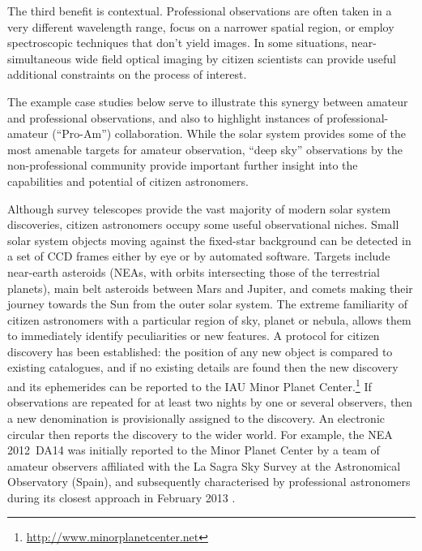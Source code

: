 \documentclass{ar2e}
\begin{document}
The third benefit is contextual.  Professional observations are often taken in a
very different wavelength range, focus on a narrower spatial region, or employ
spectroscopic techniques that don't yield images. In some situations,
near-simultaneous wide field optical imaging by citizen scientists can provide
useful additional constraints on the process of interest.

The example case studies below serve to illustrate this synergy between amateur
and professional observations, and also to highlight instances of
professional-amateur (``Pro-Am'') collaboration. While the solar system provides
some of the most amenable targets for amateur observation, ``deep sky''
observations by the non-professional community provide important further insight
into the capabilities and potential of citizen astronomers.



Although survey telescopes provide the vast majority of modern solar system
discoveries, citizen astronomers occupy some useful observational niches.  Small
solar system objects moving against the fixed-star background can be detected in
a set of CCD frames either by eye or by automated software. Targets include
near-earth asteroids (NEAs, with orbits intersecting those of the terrestrial
planets), main belt asteroids between Mars and Jupiter, and comets making their
journey towards the Sun from the outer solar system. The extreme familiarity of
citizen astronomers with a particular region of sky, planet or nebula, allows
them to immediately identify peculiarities or new features.  A protocol for
citizen discovery has been established: the position of any new object is
compared to existing catalogues, and if no existing details are found then the
new discovery and its ephemerides can be reported to the IAU Minor Planet
Center.\footnote{\url{http://www.minorplanetcenter.net}} If observations are
repeated for at least two nights by one or several observers, then a new
denomination is provisionally assigned to the discovery. An electronic circular
then reports the discovery to the wider world. For example, the NEA 2012~DA14
was initially reported to the Minor Planet Center by a team of amateur observers
affiliated with the La Sagra Sky Survey at the Astronomical Observatory (Spain),
and subsequently  characterised by professional astronomers during its closest
approach in February 2013 \citep[e.g., ][]{13deleon}.
\end{document}
